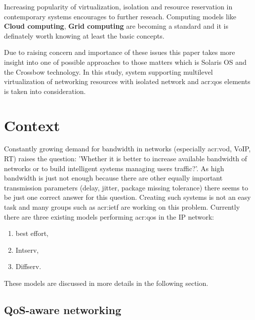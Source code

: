 \documentclass[11pt]{book}
\begin{document}
	
	Increasing popularity of virtualization, isolation and resource reservation in contemporary systems encourages to 
	further reseach. Computing models like \textbf{Cloud computing}, \textbf{Grid computing} are becoming a standard and it 
	is definately worth knowing at least the basic concepts.
	
	\medskip
	
	Due to raising concern and importance of these issues this paper takes more insight into one of 
	possible approaches	to those matters which is Solaris OS and the Crossbow technology. In this study, system supporting 
	multilevel virtualization of networking resources with isolated network and \gls{acr:qos} elements is taken into consideration.


  \chapter{Context}  %

    Constantly growing demand for bandwidth in networks (especially \gls{acr:vod}, VoIP, RT) raises the question:
    'Whether it is better to increase available bandwidth of networks or to build intelligent systems managing users
    traffic?'.  As high bandwidth is just not enough because there are other equally important transmission parameters
    (delay, jitter, package missing	tolerance) there seems to be just one correct answer for this question. Creating
    such systems is not an easy task and many groups such as \gls{acr:ietf} are working on this problem.  Currently
    there are three existing models performing \gls{acr:qos} in the IP network:

    \begin{enumerate}
      \item best effort,
      \item Intserv,
      \item Diffserv.
    \end{enumerate}

    These models are discussed in more details in the following section.


    \section{QoS-aware networking}

\end{document}
